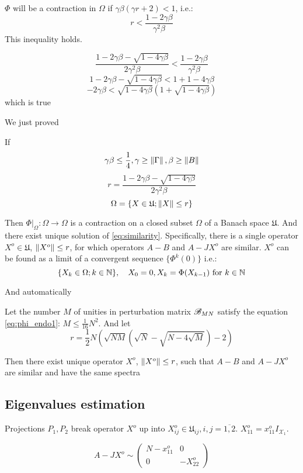 \documentclass{article}
\begin{document}
\( \Phi \) will be a contraction in \( \Omega \) if \( \gamma\beta(\gamma r + 2) < 1 \), i.e.:
\[r < \frac{1-2\gamma\beta}{\gamma^2\beta}\]
This inequality holds.
\begin{TRIVIA}
        \[\frac{1-2\gamma\beta-\sqrt{1-4\gamma\beta}}{2\gamma^2\beta} < \frac{1-2\gamma\beta}{\gamma^2\beta}\]
        \[1-2\gamma\beta-\sqrt{1-4\gamma\beta} < 1+1-4\gamma\beta\]
        \[-2\gamma\beta<\sqrt{1-4\gamma\beta}\left(1+\sqrt{1-4\gamma\beta}\right)\]
        which is true
\end{TRIVIA}

We just proved
\begin{lemma}
    If
    \[\gamma\beta\leq\frac14, \gamma\geq\left\|{\Gamma}\right\|, \beta\geq\left\|{B}\right\|\]
    \[r = \frac{1 - 2\gamma\beta - \sqrt{1-4\gamma\beta}}{2 \gamma^2 \beta}\]
    \[\Omega = \{ X\in\mathfrak U; \left\|{X}\right\| \leq r \}\]

    Then
    \( \Phi|_{\Omega}:\Omega\to\Omega \) is a contraction on a closed subset \( \Omega \) of a Banach space \( \mathfrak U \).
    And there exist unique solution of \eqref{eq:similarity}.
    Specifically, there is a single operator \( X^o\in\mathfrak U \), \( \left\|{X^o}\right\| \leq r \),
    for which operators \( A-B \) and \( A-JX^o \) are similar.
    \( X^o \) can be found as a limit of a convergent sequence \( \{ \Phi^k(0) \} \) i.e.:
    \[\{X_k\in\Omega; k\in\mathbb{N}\}, \quad X_0 = 0, X_k = \Phi(X_{k-1}) \text{ for } k\in\mathbb{N}\]
\end{lemma}
And automatically
\begin{thm}
    Let the number \( M \) of unities in perturbation matrix \( \mathscr{B}_{{M}{N}} \)
    satisfy the equation \eqref{eq:phi_endo1}: \( M \leq \frac{1}{16} N^2 \).
    And let
    \[ r = \frac12 N
        \left(
        \sqrt{NM}(\sqrt{N} - \sqrt{N-4\sqrt{M}}) - 2
        \right) \]

    Then there exist unique operator \( X^o \), \( \left\|{X^o}\right\| \leq r \), such that \( A - B \) and \( A - J X^o \) are similar
    and have the same spectra
\end{thm}

\subsection{Eigenvalues estimation}
Projections \( P_1, P_2 \) break operator \( X^o \) up
into \( X_{ij}^o\in\mathfrak U_{ij}, i,j=\overline{1,2} \).
\( X_{11}^o = x_{11}^o I_{\mathcal X_1} \).

\[
    A-JX^o \sim
    \left(
\begin{array}{c|c}
    N-x_{11}^o & 0 \\
    \hline
    0        & -X_{22}^o
\end{array}
\right)
\]
\end{document}
